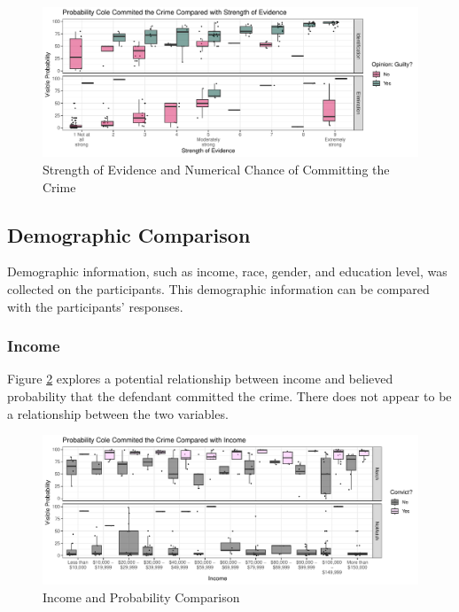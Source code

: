 \documentclass[print]{nuthesis}
\begin{document}
\begin{figure}

{\centering \includegraphics[width=\linewidth]{thesis_files/figure-latex/strengthprob-1} 

}

\caption{Strength of Evidence and Numerical Chance of Committing the Crime}\label{fig:strengthprob}
\end{figure}

\hypertarget{demographic-comparison}{%
\subsection{Demographic Comparison}\label{demographic-comparison}}

Demographic information, such as income, race, gender, and education level, was collected on the participants.
This demographic information can be compared with the participants' responses.

\hypertarget{income}{%
\subsubsection{Income}\label{income}}

Figure \ref{fig:probincome} explores a potential relationship between income and believed probability that the defendant committed the crime.
There does not appear to be a relationship between the two variables.

\begin{figure}

{\centering \includegraphics[width=\linewidth]{thesis_files/figure-latex/probincome-1} 

}

\caption{Income and Probability Comparison}\label{fig:probincome}
\end{figure}
\end{document}
